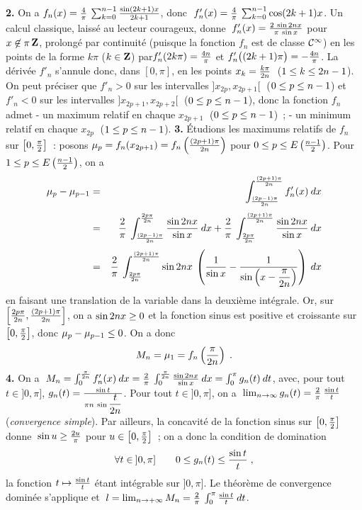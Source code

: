 \documentclass{article}
\begin{document}
\msk
{\bf 2.} On a $f_n(x)={4\over\pi}\>\sum_{k=0}^{n-1}{\sin(2k+1)x\over 2k+1}$, donc $\;f'_n(x)={4\over\pi}\>\sum_{k=0}^{n-1}\cos(2k+1)x$. Un calcul classique, laiss\'e au lecteur courageux, donne $\;f'_n(x)={2\>\sin 2nx\over\pi\>\sin x}$ pour $x\not\in{\pi\zmat}$, prolong\'e par continuit\'e (puisque la fonction $f_n$ est de classe ${\cal C}^{\infty}$) en les points de la forme $k\pi$ ($k\in\zmat$) par\break $f'_n(2k\pi)={4n\over\pi}$ et $f'_n\big((2k+1)\pi\big)=-{4n\over\pi}$.\msk\sect
La d\'eriv\'ee $f'_n$ s'annule donc, dans $[0,\pi]$, en les points $x_k={k\pi\over2n}\;$ ($1\leq k\leq 2n-1$). On peut pr\'eciser que $f'_n>0$ sur les intervalles $]x_{2p},x_{2p+1}[\;$ ($0\leq p\leq n-1$) et $f'_n<0$ sur les intervalles $]x_{2p+1},x_{2p+2}[\;$ ($0\leq p\leq n-1$), donc la fonction $f_n$ admet\ssk\new
- un maximum relatif en chaque $x_{2p+1}\;$ ($0\leq p\leq n-1$)~;\ssk\new
- un minimum relatif en chaque $x_{2p}\;$ ($1\leq p\leq n-1$).
\msk
{\bf 3.} \'Etudions les maximums relatifs de $f_n$ sur $\left[0,{\pi\over2}\right]$~: posons $\mu_p=f_n(x_{2p+1})=f_n\left({(2p+1)\pi\over2n}\right)$ pour $0\leq p\leq E\left({n-1\over2}\right)$. Pour $1\leq p\leq E\left({n-1\over2}\right)$, on a\vv
\begin{eqnarray*}
\mu_p-\mu_{p-1} & = & \int_{{(2p-1)\pi\s2n}}^{{(2p+1)\pi\s2n}}f'_n(x)\>dx\\ \nssk
& = & {2\s\pi}\>\int_{{(2p-1)\pi\s2n}}^{{2p\pi\s2n}}{\sin 2nx\s\sin x}\>dx + {2\s\pi}\>\int_{{2p\pi\s2n}}^{{(2p+1)\pi\s2n}}{\sin 2nx\s\sin x}\>dx\\ \nssk
& = & {2\s\pi}\>\int_{{2p\pi\s2n}}^{{(2p+1)\pi\s2n}}\sin 2nx\>\lp{1\s\sin x}-{1\s\sin\lp x-\dst{\pi\s2n}\rp}\rp\>dx
\end{eqnarray*}
en faisant une translation de la variable dans la deuxi\`eme int\'egrale. Or, sur $\left[{2p\pi\over2n},{(2p+1)\pi\over2n}\right]$, on a $\sin 2nx\geq0$ et la fonction sinus est positive et croissante sur $\left[0,{\pi\over2}\right]$, donc $\mu_p-\mu_{p-1}\leq0$. On a donc\vv
$$M_n=\mu_1=f_n\left({\pi\over2n}\right)\;.$$
\ssk
{\bf 4.} On a $\;M_n=\int_0^{{\pi\over2n}}f'_n(x)\>dx={2\over\pi}\>\int_0^{{\pi\over2n}}{\sin 2nx\over\sin x}\>dx=\int_0^{\pi}g_n(t)\>dt$, avec, pour tout $t\in]0,\pi]$,\break\ssk\noi
$g_n(t)={\sin t\over\pi n\>\sin\displaystyle{t\over2n}}$. Pour tout $t\in]0,\pi]$, on a $\;\lim_{n\rightarrow\infty}g_n(t)={2\over\pi}\>{\sin t\over t}$ ({\it convergence simple}). Par ailleurs, la concavit\'e de la fonction sinus sur $\left[0,{\pi\over2}\right]$ donne $\;\sin u\geq{2u\over\pi}$ pour $u\in\left[0,{\pi\over2}\right]$~; on a donc la condition de domination\vv
$$\forall t\in\>]0,\pi]\qquad 0\leq g_n(t)\leq{\sin t\over t}\;,$$
la fonction $t\mapsto{\sin t\over t}$ \'etant int\'egrable sur $]0,\pi]$. Le th\'eor\`eme de convergence domin\'ee s'applique et $\;l=\lim_{n\rightarrow+\infty}M_n={2\over\pi}\>\int_0^{\pi}{\sin t\over t}\>dt$.
\end{document}
